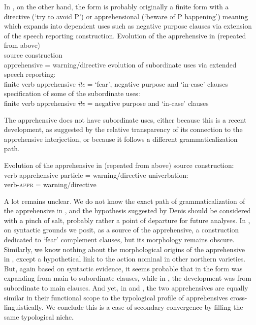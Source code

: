 \documentclass[output=paper,colorlinks,citecolor=brown]{langscibook}
\begin{document}
 In , on the other hand, the form is probably originally a finite form with a directive (`try to avoid P') or apprehensional (`beware of P happening') meaning which expands into dependent uses such as negative purpose clauses via extension of the speech reporting construction.
 \newpage
\ea \label{ex:DD80} \textnormal{Evolution of the apprehensive in  (repeated from  above)} \\
\ea \label{ex:DD80a} \textnormal{source construction} \\
\textnormal{{\ob}apprehensive{\cb} = warning/directive}
\ex \textnormal{evolution of subordinate uses via extended speech reporting:} \\
\textnormal{{\ob}finite verb {\ob}apprehensive{\cb} \textit{ile}{\cb}  = `fear', negative purpose and `in-case' clauses}
\ex \textnormal{specification of some of the subordinate uses:} \\
\textnormal{{\ob}finite verb {\ob}apprehensive{\cb} \sout{\textit{ile}}{\cb}  = negative purpose and `in-case' clauses}
\z
\z
 
The  apprehensive does not have subordinate uses, either because this is a recent development, as suggested by the relative transparency of its connection to the apprehensive interjection, or because it follows a different grammaticalization path. 



\ea \label{ex:DD81} \textnormal{Evolution of the apprehensive in  (repeated from  above)}
\ea \label{ex:DD82a} \textnormal{source construction:} \\
\textnormal{{\ob}verb apprehensive particle{\cb} = warning/directive}
\ex \label{ex:DD83b} \textnormal{univerbation:} \\
\textnormal{{\ob}verb-\textsc{appr}{\cb} = warning/directive}
\z
\z


 A lot remains unclear. We do not know the exact path of grammaticalization of the apprehensive in , and the hypothesis suggested by Denis \citeauthor{Creisselsunpublished2} should be considered with a pinch of salt, probably rather a point of departure for future analyses. In , on syntactic grounds we posit, as a source of the apprehensive, a construction dedicated to `fear' complement clauses, but its morphology remains obscure. Similarly, we know nothing about the morphological origins of the apprehensive in , except a hypothetical link to the action nominal in other northern  varieties. But, again based on syntactic evidence, it seems probable that in  the form was expanding from main to subordinate clauses, while in , the development was from subordinate to main clauses. And yet, in  and , the two apprehensives are equally similar in their functional scope to the typological profile of apprehensives cross-linguistically. We conclude this is a case of secondary convergence by filling the same typological niche.  
\end{document}
